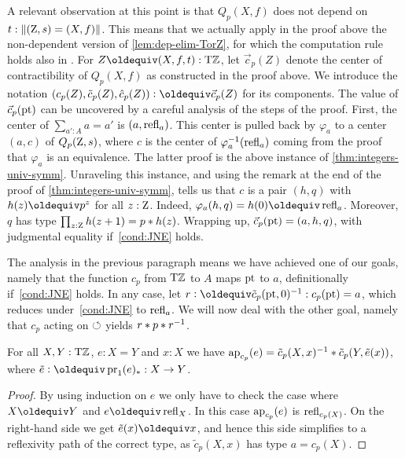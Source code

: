 \documentclass[a4paper,12pt]{amsart}
\begin{document}
A relevant observation at this point is that $Q_p(X,f)$ does not depend on
$t:\lVert(\mathrm{Z},s)=(X,f)\rVert$.
This means that we actually apply in the proof above the non-dependent version
of \cref{lem:dep-elim-TorZ}, for which the computation rule holds also in \UniMath{}.
For $Z \jdeq (X,f,t) : \TorZ$, let $\vec{c}_p(Z)$ denote the center of contractibility
of $Q_p(X,f)$ as constructed in the proof above.
  We introduce the notation $(c_p(Z),\tilde{c}_p(Z),\hat{c}_p(Z))\defeq\vec{c}_p(Z)$ for its components.
  The value of $\vec{c}_p({\mathord{\mathrm{pt}}})$ can be uncovered by a careful analysis of the steps of the proof.
First, the center of $\sum_{a':A} a=a'$ is $(a,\mathop{{\mathrm{refl}}_{a}})$.
This center is pulled back by $\varphi_{a}$ to a center
$(a,c)$ of $Q_p(\mathrm{Z},s)$, where $c$ is the center of
$\varphi_{a}^{-1}(\mathop{{\mathrm{refl}}_{a}})$ coming from the proof
that $\varphi_{a}$ is an equivalence. The latter proof
is the above instance of \cref{thm:integers-univ-symm}.
Unraveling this instance, and using the remark at the
end of the proof of \cref{thm:integers-univ-symm},
tells us that $c$ is a pair $(h,q)$ with $h(z)\jdeq p^z$
for all $z:\mathrm{Z}$. Indeed, $\varphi_{a}(h,q) = h(0) \jdeq \refl{a}$.
Moreover, $q$ has type $\prod_{z:\mathrm{Z}} h(z+1)=p* h(z)$.
Wrapping up, $\vec c_p({\mathord{\mathrm{pt}}}) = (a,h,q)$,
with judgmental equality if~\cref{cond:JNE} holds.

The analysis in the previous paragraph
means we have achieved one of our goals,
namely that the function $c_p$ from ${\mathrm{T}\mathbb{Z}}$ to $A$
maps ${\mathord{\mathrm{pt}}}$ to $a$, definitionally if~\cref{cond:JNE} holds.
In any case, let $r \defeq \tilde c_p(\pt,0)^{-1} : c_p(\pt) = a$,
which reduces under~\cref{cond:JNE} to $\mathop{{\mathrm{refl}}_{a}}$.
We will now deal with the other goal,
namely that $c_p$ acting on ${\circlearrowleft}$ yields $r * p * r^{-1}$.

\begin{lemma}\label{lem:ap-c-tilde-c}
For all $X,Y:{\mathrm{T}\mathbb{Z}}$, $e: X=Y$ and $x:X$ we have
$\mathop{{\mathrm{ap}}_{c_p}}(e) = \tilde c_p(X,x)^{-1}* \tilde c_p(Y,\tilde {e}(x))$,
where $\ptoe{e}\defeq \pr_1(e)_* : X\to Y$.
\end{lemma}
\begin{proof}
By using induction on $e$ we only have to check the case where
$X\jdeq Y$ and $e\jdeq\refl{X}$. In this case $\mathop{{\mathrm{ap}}_{c_p}}(e)$ is
$\mathop{{\mathrm{refl}}_{c_p(X)}}$. On the right-hand side we get $\ptoe{e}(x)\jdeq x$,
and hence this side simplifies to a reflexivity path of
the correct type, as $\tilde c_p(X,x)$ has type $a=c_p(X)$.
\end{proof}
\end{document}
